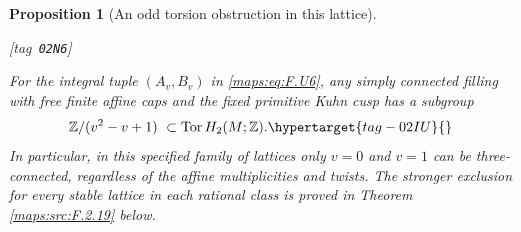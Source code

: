 \documentclass[11pt,a4paper]{article}
\numberwithin{equation}{section}
\newtheorem{proposition}[proposition]{Proposition}
\theoremstyle{definition}
\newcommand{\StatementRecord}[4]{{\upshape\footnotesize[tag~\texttt{#3}]}\enspace\ignorespaces}
\begin{document}
\begin{proposition}[An odd torsion obstruction in this lattice]\hypertarget{tag-02N6}{}\label{maps:src:F.2.17}
\StatementRecord{maps:src:F.2.17}{proved}{02N6}{\eqref{maps:eq:F.U6}, \cref{maps:src:F.2.19}, \eqref{maps:eq:F.U5}, \cref{maps:src:F.2.12}}


For the integral tuple $(A_v,B_v)$ in \eqref{maps:eq:F.U6}, any simply
connected filling with free finite affine caps and the fixed
primitive Kuhn cusp has a subgroup
\begin{equation}
 \mathbb Z/(v^2-v+1)\ \subset\operatorname{Tor}H_2(M;\mathbb Z).
 \hypertarget{tag-02IU}{}\label{maps:eq:F.U9}
\end{equation}
In particular, in this specified family of lattices only
$v=0$ and $v=1$ can be three-connected, regardless of the
affine multiplicities and twists.  The stronger exclusion for every stable lattice in each
rational class is proved in Theorem \ref{maps:src:F.2.19} below.

\end{proposition}
\end{document}
